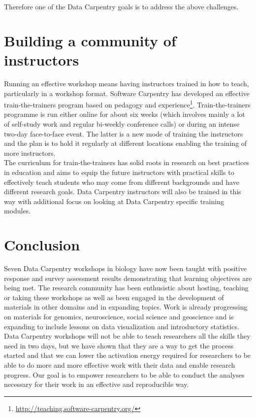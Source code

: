 \documentclass[15]{idcc}
\begin{document}
\begin{itemize}
Therefore one of the Data Carpentry goals is to address the above challenges.


\section{Building a community of instructors}
Running an effective workshop means having instructors trained in how to teach, particularly in a workshop format. Software Carpentry has developed
 an effective train-the-trainers program based on pedagogy and experience\footnote{\url{http://teaching.software-carpentry.org/}}. Train-the-trainers programme is run either online for about six weeks
 (which involves mainly a lot of self-study work and regular bi-weekly conference calls) or during an intense two-day face-to-face event. The latter
is a new mode of training the instructors and the plan is to hold it regularly at different locations enabling the training of more instructors. \\

The curriculum for train-the-trainers has solid roots in research on best practices in education and aims to equip the future instructors with practical
skills to effectively teach students who may come from different backgrounds and have different research goals. Data Carpentry instructors will
also be trained in this way with additional focus on looking at Data Carpentry specific training modules.

\section{Conclusion}


Seven Data Carpentry workshops in biology have now been taught with positive response and survey
assessment results demonstrating that learning objectives are being met. The research community
has been enthusistic about hosting, teaching or taking these workshops as well as been engaged in
 the development of materials in other domains and in expanding topics. Work is already progressing on materials
for genomics, neuroscience, social science and geoscience and is expanding to include lessons on data visualization and introductory statistics. \\



Data Carpentry workshops will not be able to teach researchers all the skills they need in two days, but we have shown that
they are a way to get the process started and that we can lower the activation energy required for researchers to be
 able to do more and more effective work with their data and enable research progress. Our goal is to empower
researchers to be able to conduct the analyses necessary for their work in an effective
and reproducible way.\\


\end{itemize}
\end{document}
